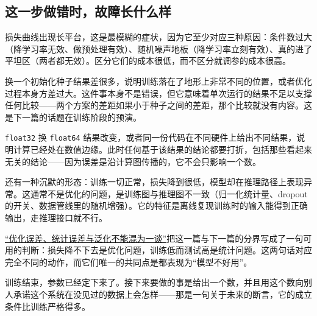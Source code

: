 \subsection{这一步做错时，故障长什么样}

损失曲线出现长平台，这是最模糊的症状，因为它至少对应三种原因：条件数过大（降学习率无效、做预处理有效）、随机噪声地板（降学习率立刻有效）、真的进了平坦区（两者都无效）。区分它们的成本很低，而不区分就调参的成本很高。

换一个初始化种子结果差很多，说明训练落在了地形上非常不同的位置，或者优化过程本身方差过大。这件事本身不是错误，但它意味着单次运行的结果不足以支撑任何比较——两个方案的差距如果小于种子之间的差距，那个比较就没有内容。这是下一篇的话题在训练阶段的预演。

\texttt{float32} 换 \texttt{float64} 结果改变，或者同一份代码在不同硬件上给出不同结果，说明计算已经处在数值边缘。此时任何基于该结果的结论都要打折，包括那些看起来无关的结论——因为误差是沿计算图传播的，它不会只影响一个数。

还有一种沉默的形态：训练一切正常，损失降到很低，模型却在推理路径上表现异常。这通常不是优化的问题，是训练图与推理图不一致（归一化统计量、dropout 的开关、数据管线里的随机增强）。它的特征是离线复现训练时的输入能得到正确输出，走推理接口就不行。

\hyperref[sec:09-Convex-Optimization/08-Nonconvex-and-Stochastic-Optimization/06]{``优化误差、统计误差与泛化不能混为一谈''}把这一篇与下一篇的分界写成了一句可用的判断：损失降不下去是优化问题，训练低而测试高是统计问题。这两句话对应完全不同的动作，而它们唯一的共同点是都表现为``模型不好用''。

训练结束，参数已经定下来了。接下来要做的事是给出一个数，并且用这个数向别人承诺这个系统在没见过的数据上会怎样——那是一句关于未来的断言，它的成立条件比训练严格得多。
